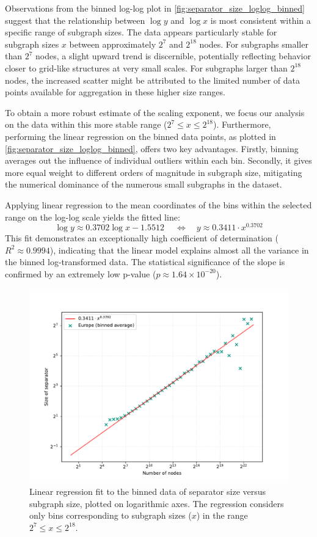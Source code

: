 Observations from the binned log-log plot in \cref{fig:separator_size_loglog_binned} suggest that the relationship between \( \log y \) and \( \log x \) is most consistent within a specific range of subgraph sizes.
The data appears particularly stable for subgraph sizes \( x \) between approximately \( 2^7 \) and \( 2^{18} \) nodes.
For subgraphs smaller than \( 2^7 \) nodes, a slight upward trend is discernible, potentially reflecting behavior closer to grid-like structures at very small scales.
For subgraphs larger than \( 2^{18} \) nodes, the increased scatter might be attributed to the limited number of data points available for aggregation in these higher size ranges.

To obtain a more robust estimate of the scaling exponent, we focus our analysis on the data within this more stable range (\( 2^7 \le x \le 2^{18} \)).
Furthermore, performing the linear regression on the binned data points, as plotted in \cref{fig:separator_size_loglog_binned}, offers two key advantages.
Firstly, binning averages out the influence of individual outliers within each bin.
Secondly, it gives more equal weight to different orders of magnitude in subgraph size, mitigating the numerical dominance of the numerous small subgraphs in the dataset.

Applying linear regression to the mean coordinates of the bins within the selected range on the log-log scale yields the fitted line:
\[ \log y \approx 0.3702 \log x - 1.5512\ \quad\iff\quad y \approx 0.3411 \cdot x^{0.3702}\]
This fit demonstrates an exceptionally high coefficient of determination (\( R^2 \approx 0.9994 \)), indicating that the linear model explains almost all the variance in the binned log-transformed data.
The statistical significance of the slope is confirmed by an extremely low p-value (\( p \approx 1.64 \times 10^{-20} \)).

\begin{figure}[tbhp]
	\centering
	\includegraphics[width=0.7\linewidth]{graphics/EuropeShowFit.pdf}
	\caption{Linear regression fit to the binned data of separator size versus subgraph size, plotted on logarithmic axes. The regression considers only bins corresponding to subgraph sizes (\(x\)) in the range \( 2^7 \le x \le 2^{18} \).}
	\label{fig:separator_size_loglog_fit}
\end{figure}

